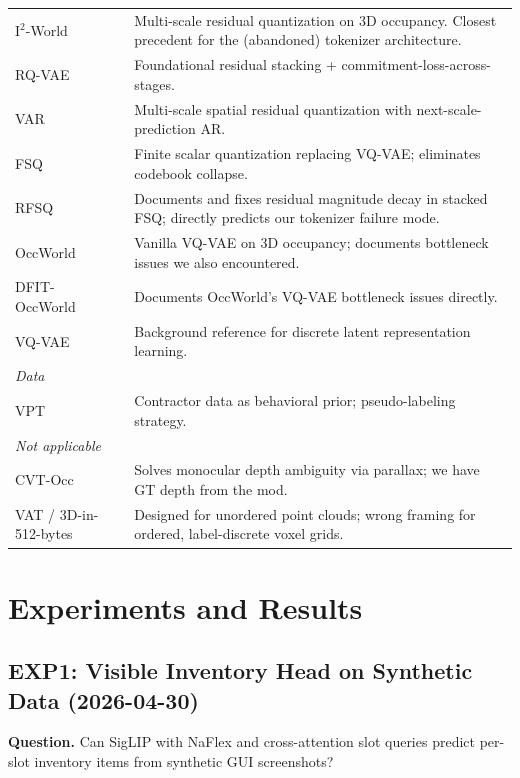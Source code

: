 \documentclass[11pt,a4paper]{article}
\begin{document}
\begin{center}
\begin{tabular}{lp{9cm}}
I$^2$-World~\cite{i2world} & Multi-scale residual quantization on 3D occupancy. Closest precedent for the (abandoned) tokenizer architecture. \\
RQ-VAE~\cite{rqvae} & Foundational residual stacking + commitment-loss-across-stages. \\
VAR~\cite{var} & Multi-scale spatial residual quantization with next-scale-prediction AR. \\
FSQ~\cite{fsq} & Finite scalar quantization replacing VQ-VAE; eliminates codebook collapse. \\
RFSQ~\cite{rfsq} & Documents and fixes residual magnitude decay in stacked FSQ; directly predicts our tokenizer failure mode. \\
OccWorld~\cite{occworld} & Vanilla VQ-VAE on 3D occupancy; documents bottleneck issues we also encountered. \\
DFIT-OccWorld~\cite{dfitocc} & Documents OccWorld's VQ-VAE bottleneck issues directly. \\
VQ-VAE~\cite{vqvae} & Background reference for discrete latent representation learning. \\
\midrule
\multicolumn{2}{l}{\textit{Data}} \\
VPT~\cite{vpt} & Contractor data as behavioral prior; pseudo-labeling strategy. \\
\midrule
\multicolumn{2}{l}{\textit{Not applicable}} \\
CVT-Occ & Solves monocular depth ambiguity via parallax; we have GT depth from the mod. \\
VAT / 3D-in-512-bytes~\cite{vat} & Designed for unordered point clouds; wrong framing for ordered, label-discrete voxel grids. \\
\bottomrule
\end{tabular}
\end{center}

\section{Experiments and Results}
\label{sec:experiments}

\subsection{EXP1: Visible Inventory Head on Synthetic Data (2026-04-30)}

\textbf{Question.} Can SigLIP with NaFlex and cross-attention slot queries predict per-slot inventory items from synthetic GUI screenshots?
\end{document}
